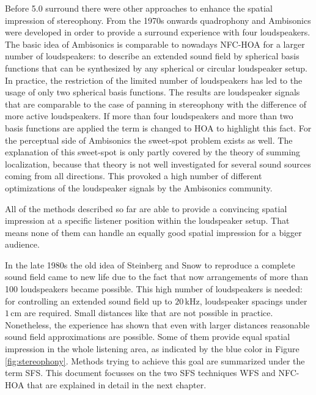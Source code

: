 Before 5.0 surround there were other approaches to enhance the spatial impression of
stereophony. From the 1970s onwards quadro\-phony and
Ambisonics\cite{Gerzon1973} were developed in
order to provide a surround experience with four loudspeakers. The basic idea of
Ambisonics is comparable to nowadays \ac{NFC-HOA} for
a larger number of loudspeakers: to describe an extended sound field by spherical
basis functions that can be synthesized by any spherical or circular loudspeaker
setup. In practice, the restriction of the limited number of loudspeakers has led to the usage
of only two spherical basis functions. The results are
loudspeaker signals that are comparable to the case of panning in
stereophony with the difference of more active
loudspeakers.\cite[E.g.][]{Frank2013}
If more than four loudspeakers and more than two basis functions
are applied the term is changed to \ac{HOA} to highlight this fact.
For the perceptual side of Ambisonics the sweet-spot problem exists as well.
The explanation of this sweet-spot is only partly covered by the
theory of summing localization, because that theory is not well investigated for
several sound sources coming from all directions. This provoked a high number of
different optimizations of the loudspeaker signals by the Ambisonics community.


All of the methods described so far are able to provide a
convincing spatial impression at a specific listener position within the
loudspeaker setup. That means none of them can handle an equally good spatial
impression for a bigger audience.

In the late 1980s the old idea of Steinberg and Snow to reproduce a
complete sound field came to new life due to the fact that now arrangements of
more than 100 loudspeakers became possible.\cite{Berkhout1988}
This high number of loudspeakers is needed: for controlling an extended
sound field up to $20$\,kHz, loudspeaker spacings under $1$\,cm
are required. Small distances like that are not possible in practice. Nonetheless,
the experience has shown that even with larger distances reasonable sound field
approximations are possible. Some of them provide equal spatial impression in the
whole listening area, as indicated by the blue color in Figure\,\ref{fig:stereophony}.
Methods trying to achieve this goal are summarized under the term \acf{SFS}.
This document focusses on the two \ac{SFS} techniques \ac{WFS} and \ac{NFC-HOA}
that are explained in detail in the next chapter.


